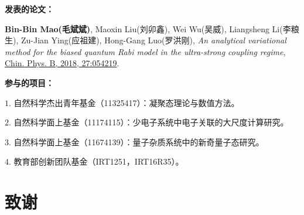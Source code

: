 \documentclass[twoside]{LZUthesis}
\begin{document}
\begin{publications}{99}
\item[]  \textbf{发表的论文：}
\item \textbf{Bin-Bin Mao(毛斌斌)}, Maoxin Liu(刘卯鑫), Wei Wu(吴威), Liangsheng Li(李粮生), Zu-Jian Ying(应祖建), Hong-Gang Luo(罗洪刚), \textit{An analytical variational method for the biased quantum Rabi model in the ultra-strong coupling regime}, \href{http://iopscience.iop.org/article/10.1088/1674-1056/27/5/054219}{Chin. Phys. B, 2018, 27:054219}.

\item[]  \textbf{参与的项目：}
\item[$1.$]自然科学杰出青年基金（11325417）：凝聚态理论与数值方法。
\item[$2.$]自然科学面上基金（11174115）：少电子系统中电子关联的大尺度计算研究。
\item[$3.$]自然科学面上基金（11674139）：量子杂质系统中的新奇量子态研究。
\item[$4.$]教育部创新团队基金（IRT1251，IRT16R35）。

\end{publications}


\chapter{致谢}

\begin{thanks}

\end{thanks}
\end{document}
